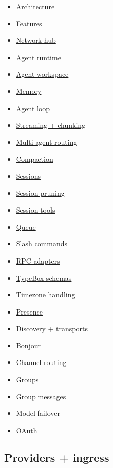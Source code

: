 \begin{itemize}
  \item \href{/concepts/architecture}{Architecture}
  \item \href{/concepts/features}{Features}
  \item \href{/network}{Network hub}
  \item \href{/concepts/agent}{Agent runtime}
  \item \href{/concepts/agent-workspace}{Agent workspace}
  \item \href{/concepts/memory}{Memory}
  \item \href{/concepts/agent-loop}{Agent loop}
  \item \href{/concepts/streaming}{Streaming + chunking}
  \item \href{/concepts/multi-agent}{Multi-agent routing}
  \item \href{/concepts/compaction}{Compaction}
  \item \href{/concepts/session}{Sessions}
  \item \href{/concepts/session-pruning}{Session pruning}
  \item \href{/concepts/session-tool}{Session tools}
  \item \href{/concepts/queue}{Queue}
  \item \href{/tools/slash-commands}{Slash commands}
  \item \href{/reference/rpc}{RPC adapters}
  \item \href{/concepts/typebox}{TypeBox schemas}
  \item \href{/concepts/timezone}{Timezone handling}
  \item \href{/concepts/presence}{Presence}
  \item \href{/gateway/discovery}{Discovery + transports}
  \item \href{/gateway/bonjour}{Bonjour}
  \item \href{/channels/channel-routing}{Channel routing}
  \item \href{/channels/groups}{Groups}
  \item \href{/channels/group-messages}{Group messages}
  \item \href{/concepts/model-failover}{Model failover}
  \item \href{/concepts/oauth}{OAuth}
\end{itemize}


\subsection{Providers + ingress}


